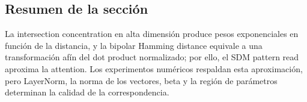 \subsection{Resumen de la sección}

La intersection concentration en alta dimensión produce pesos exponenciales en función de la distancia, y la bipolar Hamming distance equivale a una transformación afín del dot product normalizado; por ello, el SDM pattern read aproxima la attention. Los experimentos numéricos respaldan esta aproximación, pero LayerNorm, la norma de los vectores, beta y la región de parámetros determinan la calidad de la correspondencia.
